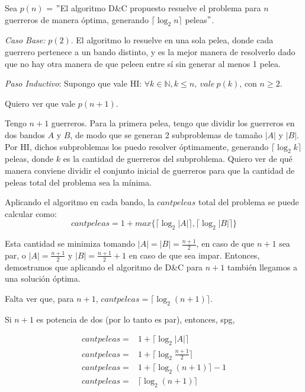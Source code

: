 \par Sea $p(n)$ = $"$El algoritmo D\&C propuesto resuelve el problema para $n$ guerreros de manera óptima, generando $\lceil \log _2 n \rceil$ peleas$"$. 

\par \textit{Caso Base:} $p(2)$. El algoritmo lo resuelve en una sola pelea, donde cada guerrero pertenece a un bando distinto, y es la mejor manera de resolverlo dado que no hay otra manera de que peleen entre sí sin generar al menos 1 pelea.

\par \textit{Paso Inductivo}: Supongo que vale HI: $\forall k \in \mathbb{N}, k \leq n, \ vale \ p(k)$, con $n \geq 2$.
\par Quiero ver que vale $p(n+1)$.
\par Tengo $n+1$ guerreros. Para la primera pelea, tengo que dividir los guerreros en dos bandos $A$ y $B$, de modo que se generan 2 subproblemas de tamaño $|A|$ y $|B|$.
Por HI, dichos subproblemas los puedo resolver óptimamente, generando $\lceil \log _2 k \rceil$ peleas, donde $k$ es la cantidad de guerreros del subproblema. Quiero ver de qué manera conviene dividir el conjunto inicial de guerreros para que la cantidad de peleas total del problema sea la mínima.
\par Aplicando el algoritmo en cada bando, la $cantpeleas$ total del problema se puede calcular como: 
\[ cantpeleas = 1 + max\{ \lceil \log _2 |A| \rceil , \lceil \log _2 |B| \rceil \}\]
\par Esta cantidad se minimiza tomando $|A| = |B| = \frac{n+1}{2}$, en caso de que $n+1$ sea par, o $|A| = \frac{n+1}{2}$ y $|B| = \frac{n+1}{2} + 1$ en caso de que sea impar. Entonces, demostramos que aplicando el algoritmo de D\&C para $n+1$ también llegamos a una solución óptima.

\par Falta ver que, para $n+1$,  $cantpeleas = \lceil \log _2 (n+1) \rceil$.

\par Si $n+1$ es potencia de dos (por lo tanto es par), entonces, spg, 

  \begin{equation}
  \begin{aligned}
  cantpeleas =& 1 + \lceil \log _2 |A| \rceil \\
  cantpeleas =& 1 + \lceil \log _2 \frac{n+1}{2} \rceil \\
  cantpeleas =& 1 + \lceil \log _2 (n+1) \rceil  - 1 \\
  cantpeleas =& \lceil \log _2 (n+1) \rceil \\
  \end{aligned}
  \end{equation}

